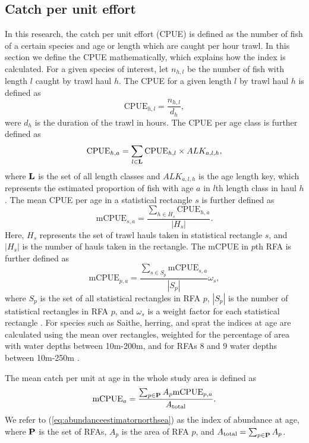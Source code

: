 \documentclass[a4paper 12pt]{article}
\numberwithin{equation}{section}
\begin{document}
\subsection{Catch per unit effort}
\label{sec:cpueestimators}
In this research, the catch per unit effort (CPUE) is defined as the number of fish of a certain species and age or length which are caught per hour trawl. In this section we define the CPUE mathematically, which explains how the index is calculated. For a given species of interest, let $n_{h,l}$ be the number of fish with length $l$ caught by trawl haul $h$. The CPUE for a given length $l$ by trawl haul $h$ is defined as 
\begin{equation}\label{eq:cpueHaul}
\mathrm{CPUE}_{h,l} =\frac{n_{h,l}}{d_h},
\end{equation}
were $d_h$ is the duration of the trawl in hours. The CPUE per age class is further defined as
\begin{equation}\label{eq:cpueALK}
\mathrm{CPUE}_{h,a} =\sum_{l \in {\bf L}}\mathrm{CPUE}_{h, l} \times ALK_{a,l,h},
\end{equation}
where ${\bf L}$ is the set of all length classes and $ALK_{a,l,h}$ is the age length key, which represents the estimated proportion of fish with age $a$ in $l$th length class in haul $h$. The mean CPUE per age in a statistical rectangle $s$ is further defined as
\begin{equation}\label{eq:cpueRec}
\mathrm{mCPUE}_{s,a} =\frac{\sum_{h \in H_{s}} \mathrm{CPUE}_{h,a}}{|H_{s}|}.
\end{equation}
Here, $H_{s}$ represents the set of trawl hauls taken in statistical rectangle $s$, and $|H_{s}|$ is the number of hauls taken in the rectangle. The mCPUE in $p$th RFA is further defined as
\begin{equation}\label{eq:cpueRFA}
\mathrm{mCPUE}_{p,a} = \frac{ \sum_{s \in S_{p}} \mathrm{mCPUE}_{s,a}}{|S_{p}|} \omega_s,
\end{equation}
where $S_{p}$ is the set of all statistical rectangles in RFA $p$, $|S_{p}|$ is the number of statistical rectangles in RFA $p$, and $\omega_s$ is a weight factor for each statistical rectangle \citep{ICES2013}. For species such as Saithe, herring, and sprat the indices at age are calculated using the mean over rectangles, weighted for the percentage of area with water depths between 10m-200m, and for RFAs 8 and 9 water depths between 10m-250m \citep{ICES2013}.

 The mean catch per unit at age in the whole study area is defined as
\begin{equation}
\text{mCPUE}_a= \frac{\sum_{p\in {\bf P}} A_{p}  \mathrm{mCPUE}_{p,a}}{A_{\text{total}}}.
\label{eq:abundanceestimatornorthsea}
\end{equation}
We refer to (\ref{eq:abundanceestimatornorthsea}) as the index of abundance at age, where ${\bf P}$ is the set of RFAs, $A_p$ is the area of RFA $p$, and $A_{\text{total}} = \sum_{p\in {\bf P}} A_{p}$.
\end{document}
